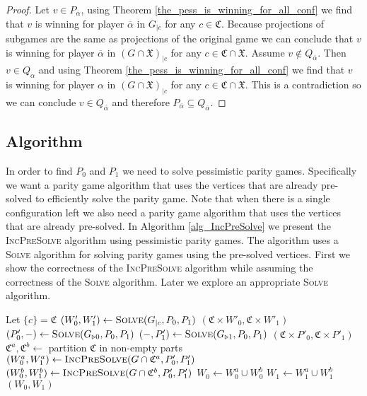 \begin{lemma}
\begin{proof}
		
		Let $v \in P_{\overline{\alpha}}$, using Theorem \ref{the_pess_is_winning_for_all_conf} we find that $v$ is winning for player $\overline{\alpha}$ in $G_{|c}$ for any $c \in \mathfrak{C}$. Because projections of subgames are the same as projections of the original game we can conclude that $v$ is winning for player $\overline{\alpha}$ in $(G \cap \mathfrak{X})_{|c}$ for any $c \in \mathfrak{C} \cap \mathfrak{X}$.	Assume $v \notin Q_{\overline{\alpha}}$. Then $v \in Q_{\alpha}$ and using Theorem \ref{the_pess_is_winning_for_all_conf} we find that $v$ is winning for player $\alpha$ in $(G \cap \mathfrak{X})_{|c}$ for any $c \in \mathfrak{C} \cap \mathfrak{X}$. This is a contradiction so we can conclude $v \in Q_{\overline{\alpha}}$ and therefore $P_{\overline{\alpha}} \subseteq Q_{\overline{\alpha}}$.
	\end{proof}
\end{lemma}
\subsection{Algorithm}
In order to find $P_0$ and $P_1$ we need to solve pessimistic parity games. Specifically we want a parity game algorithm that uses the vertices that are already pre-solved to efficiently solve the parity game. Note that when there is a single configuration left we also need a parity game algorithm that uses the vertices that are already pre-solved. In Algorithm \ref{alg_IncPreSolve} we present the \textsc{IncPreSolve} algorithm using pessimistic parity games. The algorithm uses a \textsc{Solve} algorithm for solving parity games using the pre-solved vertices. First we show the correctness of the \textsc{IncPreSolve} algorithm while assuming the correctness of the \textsc{Solve} algorithm. Later we explore an appropriate \textsc{Solve} algorithm.
\begin{algorithm}
	\caption{$\textsc{IncPreSolve}(G = (V,V_0,V_1, E, \Omega, \mathfrak{C}, \theta), P_0,P_1)$}\label{alg_IncPreSolve}
	\begin{algorithmic}[1]
		\State Let $\{c\} = \mathfrak{C}$
		\State $(W'_0,W'_1) \gets \textsc{Solve}(G_{|c}, P_0,P_1)$
		\State \Return $(\mathfrak{C} \times W'_0, \mathfrak{C} \times W'_1)$
		\EndIf
		\State $(P'_0,-) \gets \textsc{Solve}(G_{\triangleright0}, P_0, P_1)$
		\State $(-,P'_1) \gets \textsc{Solve}(G_{\triangleright1}, P_0, P_1)$
		\State \Return $(\mathfrak{C} \times P'_0, \mathfrak{C} \times P'_1)$
		\EndIf
		\State $\mathfrak{C}^a, \mathfrak{C}^b \gets $ partition $\mathfrak{C}$ in non-empty parts
		\State $(W_0^a, W_1^a) \gets \textsc{IncPreSolve}(G \cap \mathfrak{C}^a, P'_0,P'_1)$
		\State $(W_0^b, W_1^b) \gets \textsc{IncPreSolve}(G \cap \mathfrak{C}^b, P'_0,P'_1)$
		\State $W_0 \gets W_0^a \cup W_0^b$
		\State $W_1 \gets W_1^a \cup W_1^b$
		\State \Return $(W_0,W_1)$
	\end{algorithmic}
\end{algorithm}


